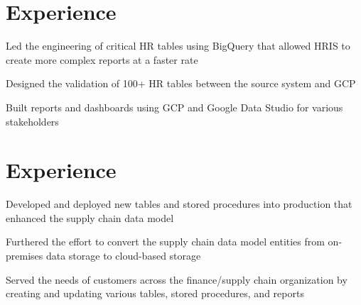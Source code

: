 \documentclass[]{plushcv}
\begin{document}
%
%



%
%

\begin{minipage}[t]{0.70\textwidth} 



\section{Experience}
\vspace{\topsep} %
\begin{tightemize}
\sectionsep
\item Led the engineering of critical HR tables using BigQuery that allowed HRIS to create more complex reports at a faster rate
\item Designed the validation of 100+ HR tables between the source system and GCP 
\item Built reports and dashboards using GCP and Google Data Studio for various stakeholders
\end{tightemize}
\sectionsep

\section{Experience}
\vspace{\topsep} %
\begin{tightemize}
\sectionsep
\item Developed and deployed new tables and stored procedures into production that enhanced the supply chain data model 
\item Furthered the effort to convert the supply chain data model entities from on-premises data storage to cloud-based storage
\item Served the needs of customers across the finance/supply chain organization by creating and updating various tables, stored procedures, and reports
\end{tightemize}
\sectionsep


\end{minipage}
\end{document}
